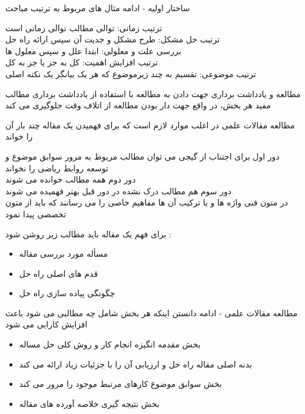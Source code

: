 \documentclass[12pt]{beamer}
\makeatletter
\newcommand{\rtlist}{\raggedleft\rightskip\@totalleftmargin}
\newcommand{\framefontsizelarge}{\fontsize{18pt}{0pt}\selectfont}
\newcommand{\frametitlefontsize}{\fontsize{20pt}{0pt}\selectfont}
\makeatother
\begin{document}
\begin{persian}
	\begin{frame}{\frametitlefontsize ساختار اولیه - ادامه}
		مثال های مربوط به ترتیب مباحث
		
		ترتیب زمانی: توالی مطالب توالی زمانی است \\
		ترتیب حل مشکل: طرح مشکل و جدیت آن سپس ارائه راه حل \\
		بررسی علت و معلولی: ابتدا علل و سپس معلول ها \\ 
		ترتیب افزایش اهمیت: کل به جز یا جز به کل \\ 
		ترتیب موضوعی: تقسیم به چند زیرموضوع که هر یک بیانگر یک نکته اصلی 
	\end{frame}
	
	\begin{frame}{\frametitlefontsize مطالعه و یادداشت برداری}
		\framefontsizelarge
		جهت دادن به مطالعه با استفاده از یادداشت برداری مطالب مفید هر بخش، در واقع جهت دار بودن مطالعه از اتلاف وقت جلوگیری می کند
	\end{frame}

	\begin{frame}{\frametitlefontsize مطالعه مقالات علمی}
		در اغلب موارد لازم است که برای فهمیدن یک مقاله چند بار آن را خواند
		
		دور اول برای اجتناب از گیجی می توان مطالب مربوط به مرور سوابق موضوع و توسعه روابط ریاضی را نخواند\\
		دور دوم همه مطالب خوانده می شوند\\
		دور سوم هم مطالب درک نشده در دور قبل بهتر فهمیده می شوند\\
		در متون فنی واژه ها و یا ترکیب آن ها مفاهیم خاصی را می رسانند که باید از متون تخصصی پیدا نمود
		
		برای فهم یک مقاله باید مطالب زیر روشن شود :\\
		\begin{itemize}\rtlist
			\item مسأله مورد بررسی مقاله
			\item قدم های اصلی راه حل
			\item چگونگی پیاده سازی راه حل
		\end{itemize}
	\end{frame}
	
	\begin{frame}{\frametitlefontsize مطالعه مقالات علمی - ادامه}
		دانستن اینکه هر بخش شامل چه مطالبی می شود باعث افزایش کارایی می شود\\
		
		\begin{itemize}\rtlist
			\item بخش مقدمه انگیزه انجام کار و روش کلی حل مساله
			\item بدنه اصلی مقاله راه حل و ارزیابی آن را با جزئیات زیاد ارائه می کند
			\item بخش سوابق موضوع کارهای مرتبط موجود را مرور می کند
			\item بخش نتیجه گیری خلاصه آورده های مقاله
		\end{itemize}
	\end{frame}


\end{persian}
\end{document}

